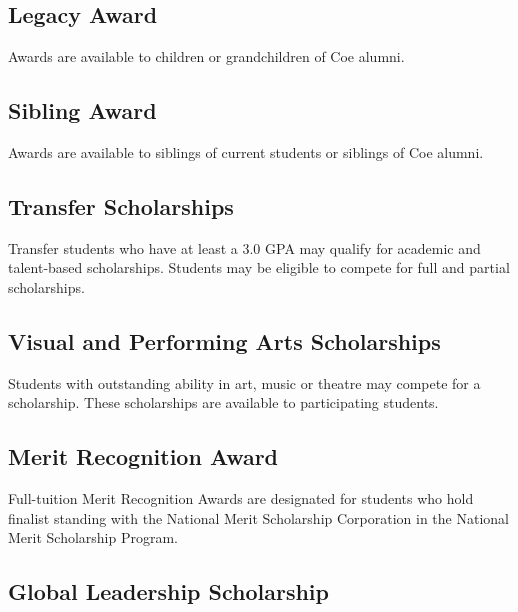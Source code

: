 \documentclass[
  letterpaper,
]{scrbook}
\begin{document}
\subsection{\texorpdfstring{\textbf{Legacy
Award}}{Legacy Award}}\label{legacy-award}

Awards are available to children or grandchildren of Coe alumni.

\subsection{\texorpdfstring{\textbf{Sibling
Award}}{Sibling Award}}\label{sibling-award}

Awards are available to siblings of current students or siblings of Coe
alumni.

\subsection{\texorpdfstring{\textbf{Transfer
Scholarships}}{Transfer Scholarships}}\label{transfer-scholarships}

Transfer students who have at least a 3.0 GPA may qualify for academic
and talent-based scholarships. Students may be eligible to compete for
full and partial scholarships.

\subsection{\texorpdfstring{\textbf{Visual and Performing Arts
Scholarships}}{Visual and Performing Arts Scholarships}}\label{visual-and-performing-arts-scholarships}

Students with outstanding ability in art, music or theatre may compete
for a scholarship. These scholarships are available to participating
students.

\subsection{\texorpdfstring{\textbf{Merit Recognition
Award}}{Merit Recognition Award}}\label{merit-recognition-award}

Full-tuition Merit Recognition Awards are designated for students who
hold finalist standing with the National Merit Scholarship Corporation
in the National Merit Scholarship Program.

\subsection{\texorpdfstring{\textbf{Global Leadership
Scholarship}}{Global Leadership Scholarship}}\label{global-leadership-scholarship}
\end{document}
